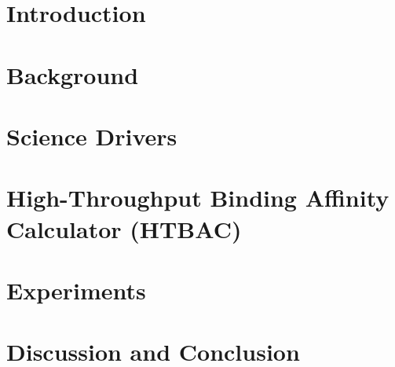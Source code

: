 \documentclass[conference]{IEEEtran}
\begin{document}
\section{Introduction}\label{sec:intro}



\section{Background}\label{sec:related-work}



\section{Science Drivers}\label{sec:science-drivers}




\section{High-Throughput Binding Affinity Calculator
(HTBAC)}\label{sec:htbac}



\section{Experiments}\label{sec:experiments}



\section{Discussion and Conclusion}\label{sec:discussion}

\end{document}
